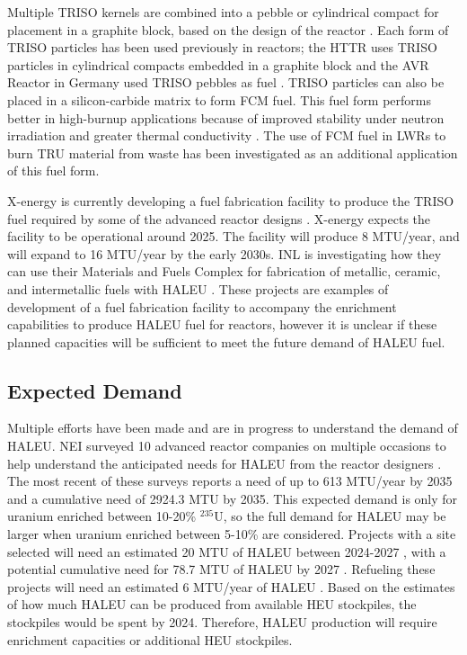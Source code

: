 Multiple \gls{TRISO} kernels are combined into a pebble or 
cylindrical compact for placement in a graphite block, based on the 
design of the reactor \cite{demkowicz_coated_2019}. Each form of 
\gls{TRISO} particles has been used previously in reactors; the \gls{HTTR}
uses 
\gls{TRISO} particles in cylindrical compacts embedded in a graphite block 
\cite{shiozawa_overview_2004} and the AVR Reactor in Germany used 
\gls{TRISO} pebbles as fuel \cite{gottaut_results_1990}.
\gls{TRISO} particles can also be placed in a silicon-carbide matrix 
to form \gls{FCM} fuel. This fuel form performs better in high-burnup 
applications because of improved stability under neutron irradiation and 
greater thermal conductivity \cite{snead_fully_2011}. The use of 
\gls{FCM} fuel in \glspl{LWR} to burn \gls{TRU} material from waste 
has been investigated \cite{snead_fully_2011,venneri_fully_2011} as 
an additional application of this fuel form. 

X-energy is currently developing a fuel fabrication facility to 
produce the \gls{TRISO} fuel required by some of the advanced 
reactor designs \cite{x-energy_triso-x_2022}. X-energy expects the 
facility to be operational around 2025. The facility will 
produce 8 MTU/year, and will expand to 16 MTU/year 
by the early 2030s. \gls{INL} is investigating 
how they can use their Materials and Fuels Complex for 
fabrication of metallic, ceramic, and intermetallic fuels with 
\gls{HALEU} \cite{crawford_fuel_2019}. These projects 
are examples of development 
of a fuel fabrication facility to accompany the enrichment 
capabilities to produce \gls{HALEU} fuel for reactors, however
it is unclear if these planned capacities will be sufficient to 
meet the future demand of \gls{HALEU} fuel. 

\subsection{Expected Demand}
Multiple efforts have been made and are in progress to understand the 
demand of \gls{HALEU}. \gls{NEI} surveyed 10 advanced reactor 
companies on multiple occasions to help understand the anticipated needs
for \gls{HALEU} from the reactor designers 
\cite{korsnick_need_2018,korsnick_updated_2020,korsnick_updated_2021}. 
The most recent of these surveys \cite{korsnick_updated_2021} reports 
a need of up to 613 MTU/year by 2035 and a cumulative need of 2924.3 MTU 
by 2035. This expected demand is only for uranium enriched between 10-20\%
$^{235}$U, so the full demand for \gls{HALEU} may be larger when uranium 
enriched between 5-10\% are considered. Projects with a site selected 
will need an estimated 20 MTU of \gls{HALEU} between 2024-2027 
\cite{nuclear_energy_institute_establishing_2022}, with a potential cumulative 
need for 78.7 MTU of \gls{HALEU} by 2027 \cite{korsnick_updated_2021}. 
Refueling these projects will need an estimated 6 MTU/year of 
\gls{HALEU} \cite{nuclear_energy_institute_establishing_2022}. Based 
on the estimates of how much \gls{HALEU} can be produced from available 
\gls{HEU} stockpiles, the stockpiles would be spent by 2024. Therefore, 
\gls{HALEU} production will require enrichment capacities or additional 
\gls{HEU} stockpiles. 

